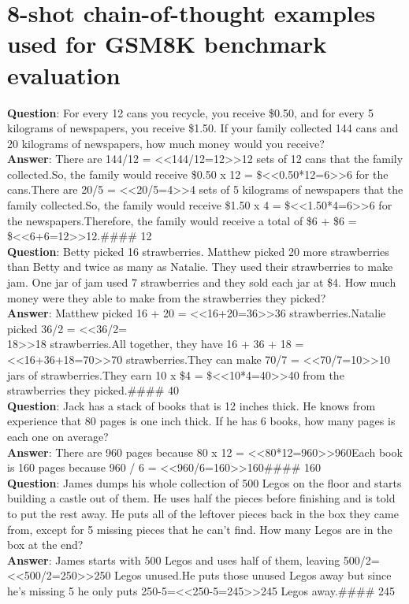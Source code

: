 \section{8-shot chain-of-thought examples used for GSM8K benchmark evaluation} \label{8shot}
\textbf{Question}: For every 12 cans you recycle, you receive \$0.50, and for every 5 kilograms of newspapers, you receive \$1.50. If your family collected 144 cans and 20 kilograms of newspapers, how much money would you receive?\\
\textbf{Answer}: There are 144/12 = <<144/12=12>>12 sets of 12 cans that the family collected.So, the family would receive \$0.50 x 12 = \$<<0.50*12=6>>6 for the cans.There are 20/5 = <<20/5=4>>4 sets of 5 kilograms of newspapers that the family collected.So, the family would receive \$1.50 x 4 = \$<<1.50*4=6>>6 for the newspapers.Therefore, the family would receive a total of \$6 + \$6 = \$<<6+6=12>>12.\#\#\#\# 12\\
\textbf{Question}: Betty picked 16 strawberries. Matthew picked 20 more strawberries than Betty and twice as many as Natalie. They used their strawberries to make jam. One jar of jam used 7 strawberries and they sold each jar at \$4. How much money were they able to make from the strawberries they picked?\\
\textbf{Answer}: Matthew picked 16 + 20 = <<16+20=36>>36 strawberries.Natalie picked 36/2 = <<36/2=\\
18>>18 strawberries.All together, they have 16 + 36 + 18 = <<16+36+18=70>>70 strawberries.They can make 70/7 = <<70/7=10>>10 jars of strawberries.They earn 10 x \$4 = \$<<10*4=40>>40 from the strawberries they picked.\#\#\#\# 40\\
\textbf{Question}: Jack has a stack of books that is 12 inches thick. He knows from experience that 80 pages is one inch thick. If he has 6 books, how many pages is each one on average?\\
\textbf{Answer}: There are 960 pages because 80 x 12 = <<80*12=960>>960Each book is 160 pages because 960 / 6 = <<960/6=160>>160\#\#\#\# 160\\
\textbf{Question}: James dumps his whole collection of 500 Legos on the floor and starts building a castle out of them.  He uses half the pieces before finishing and is told to put the rest away.  He puts all of the leftover pieces back in the box they came from, except for 5 missing pieces that he can't find.  How many Legos are in the box at the end?\\
\textbf{Answer}: James starts with 500 Legos and uses half of them, leaving 500/2=<<500/2=250>>250 Legos unused.He puts those unused Legos away but since he's missing 5 he only puts 250-5=<<250-5=245>>245 Legos away.\#\#\#\# 245\\
